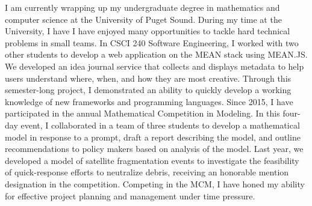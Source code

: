I am currently wrapping up my undergraduate degree in mathematics and computer science at the University of Puget Sound.
During my time at the University, I have I have enjoyed many opportunities to tackle hard technical problems in small teams.
In CSCI 240 Software Engineering, I worked with two other students to develop a web application on the MEAN stack using MEAN.JS.
We developed an idea journal service that collects and displays metadata to help users understand where, when, and how they are most creative.
Through this semester-long project, I demonstrated an ability to quickly develop a working knowledge of new frameworks and programming languages.
Since 2015, I have participated in the annual Mathematical Competition in Modeling.
In this four-day event, I collaborated in a team of three students to develop a mathematical model in response to a prompt, draft a report describing the model, and outline recommendations to policy makers based on analysis of the model.
Last year, we developed a model of satellite fragmentation events to investigate the feasibility of quick-response efforts to neutralize debris, receiving an honorable mention designation in the competition.
Competing in the MCM, I have honed my ability for effective project planning and management under time pressure.
